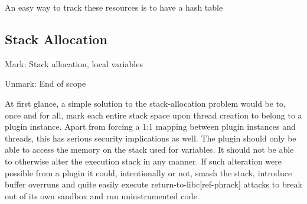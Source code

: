 An easy way to track these resources is to have a hash table

\subsection {Stack Allocation}

Mark: Stack allocation, local variables

Unmark: End of scope

At first glance, a simple solution to the stack-allocation problem would be to,
once and for all, mark each entire stack space upon thread creation to belong to
a plugin instance. Apart from forcing a 1:1 mapping between plugin instances and
threads, this has serious security implications as well. The plugin should only
be able to access the memory on the stack used for variables. It should not be
able to otherwise alter the execution stack in any manner. If such alteration
were possible from a plugin it could, intentionally or not, smash the stack,
introduce buffer overruns and quite easily execute return-to-libc[ref-phrack]
attacks to break out of its own sandbox and run uninstrumented code.


